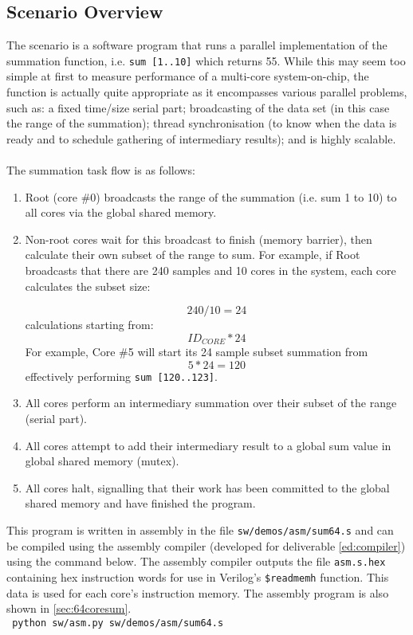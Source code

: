 \subsection{Scenario Overview}
\label{sec:scenario}
The scenario is a software program that runs a parallel implementation of the summation function, i.e. \verb|sum [1..10]| which returns 55. While this may seem too simple at first to measure performance of a multi-core system-on-chip, the function is actually quite appropriate as it encompasses various parallel problems, such as: a fixed time/size serial part; broadcasting of the data set (in this case the range of the summation); thread synchronisation (to know when the data is ready and to schedule gathering of intermediary results); and is highly scalable.
\\\\
The summation task flow is as follows:
\begin{enumerate}
\item Root (core \#0) broadcasts the range of the summation (i.e. sum 1 to 10) to all cores via the global shared memory.
\item Non-root cores wait for this broadcast to finish (memory barrier), then calculate their own subset of the range to sum. For example, if Root broadcasts that there are 240 samples and 10 cores in the system, each core calculates the subset size:

\begin{equation}
240/10 = 24
\end{equation} calculations starting from:
\begin{equation}
{ID_{CORE}} * 24
\end{equation}
For example, Core \#5 will start its 24 sample subset summation from
\begin{equation}
5 * 24 = 120
\end{equation}
effectively performing \verb|sum [120..123]|.

\item All cores perform an intermediary summation over their subset of the range (serial part).
\item All cores attempt to add their intermediary result to a global sum value in global shared memory (mutex).
\item All cores halt, signalling that their work has been committed to the global shared memory and have finished the program.
\end{enumerate}

This program is written in assembly in the file \verb|sw/demos/asm/sum64.s| and can be compiled using the assembly compiler (developed for deliverable \ref{ed:compiler}) using the command below. The assembly compiler outputs the file \verb|asm.s.hex| containing hex instruction words for use in Verilog's \verb|$readmemh| function. This data is used for each core's instruction memory. The assembly program is also shown in \cref{sec:64coresum}.
\\
\texttt{                      python sw/asm.py sw/demos/asm/sum64.s}

